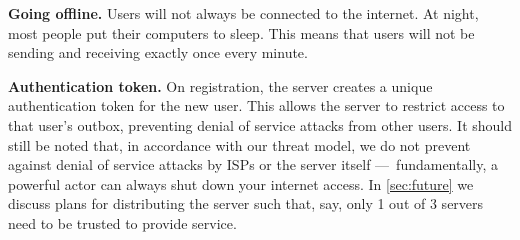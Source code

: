 

\textbf{Going offline.} Users will not always be connected to the internet. At night, most people put their computers to sleep. This means that users will not be sending and receiving exactly once every minute.  

\textbf{Authentication token.} 
On registration, the server creates a unique authentication token for the new user. This allows the server to restrict access to that user's outbox, preventing denial of service attacks from other users. It should still be noted that, in accordance with our threat model, we do not prevent against denial of service attacks by ISPs or the server itself — fundamentally, a powerful actor can always shut down your internet access. In \cref{sec:future} we discuss plans for distributing the server such that, say, only 1 out of 3 servers need to be trusted to provide service.

